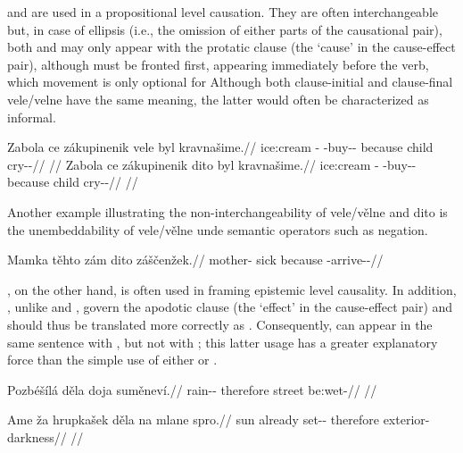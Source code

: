  and  are used in a propositional level causation.
They are often interchangeable but, in case of ellipsis (i.e., the omission of
either parts of the causational pair), both  and  may
only appear with the protatic clause (the `cause' in the cause-effect pair),
although  must be fronted first, appearing immediately before the
verb, which movement is only optional for  Although both
clause-initial and clause-final vele/velne have the same meaning, the latter
would often be characterized as informal.


\pex
\a\begingl
  \gla Zabola ce zákupinenik vele byl kravnašime.//
  \glb ice:cream \Dem{}-\Acc{} \Neg{}-buy-\Pv{}-\Pf{} because child cry-\Av{}-\Prog{}//
  \glft {}//
\endgl
\a\begingl
  \gla Zabola ce zákupinenik dito byl kravnašime.//
  \glb ice:cream \Dem{}-\Acc{} \Neg{}-buy-\Pv{}-\Pf{} because child cry-\Av{}-\Prog{}//
  \glft {}//
\endgl
\a {}
\a \ljudge{*}
\a {} 
\a {}
\xe 

Another example illustrating the non-interchangeability of vele/vělne and dito is the unembeddability of vele/vělne unde semantic operators such as negation.

\pex
\a\begingl
  \gla Mamka těhto zám dito záščenžek.//
  \glb mother-\Dim{} sick \Neg{} because \Neg{}-arrive-\Av{}-\Pf{}//
\endgl
\a \ljudge{*}
\xe

, on the other hand, is often used in framing epistemic level
causality. In addition, , unlike  and ,
govern the apodotic clause (the `effect' in the cause-effect pair) and should
thus be translated more correctly as . Consequently,
 can appear in the same sentence with , but not with
; this latter usage has a greater explanatory force than the simple
use of either  or .

\pex
\begingl
  \gla Pozbéšílá děla doja suměneví.//
  \glb rain-\Av{}-\SubjI{} therefore street be:wet-\Cont{}//
  \glft {}//
\endgl
\xe

\pex
\begingl
  \gla Ame ža hrupkašek děla na mlane spro.//
  \glb sun already set-\Av{}-\Pf{} therefore \Loc{} exterior-\Acc{} darkness//
  \glft {}//
\endgl
\xe

